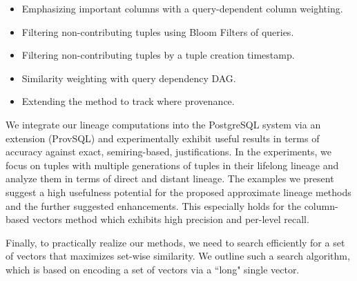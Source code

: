 {\begin{itemize}
    \item Emphasizing important columns with a query-dependent column weighting.
    \item Filtering non-contributing tuples using Bloom Filters of queries.
    \item Filtering non-contributing tuples by a tuple creation timestamp.
    \item Similarity weighting with query dependency DAG.
    \item Extending the method to track where provenance.
\end{itemize}
\par We integrate our lineage computations into the PostgreSQL system via an extension (ProvSQL) and experimentally exhibit useful results in terms of accuracy against exact, semiring-based, justifications.  In the experiments, we focus on tuples with multiple generations of tuples in their lifelong lineage and analyze them in terms of direct and distant lineage. The examples we present suggest a high usefulness potential for the proposed approximate lineage methods and the further suggested enhancements. This especially holds for the column-based vectors method which exhibits high precision and per-level recall.
\par Finally, to practically realize our methods, we need to search efficiently for a set of vectors that maximizes set-wise similarity. We outline such a search algorithm, which is based on encoding a set of vectors via a ``long" single vector. 


} %


